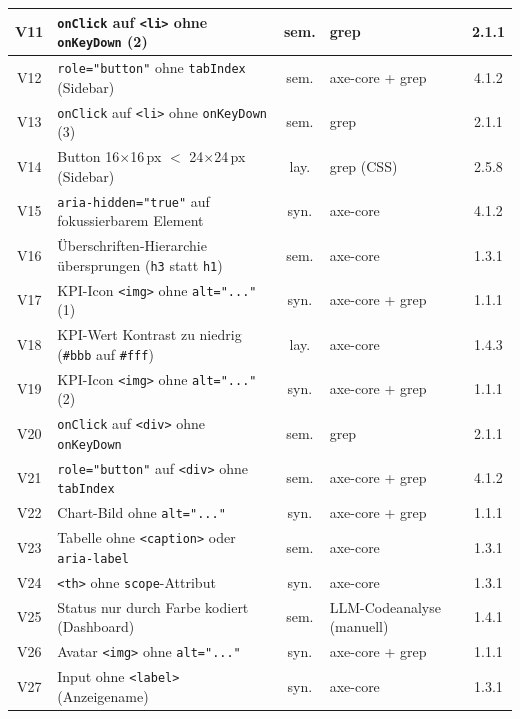 \begin{longtable}{|c|p{6.4cm}|c|p{4.0cm}|c|}
V11 & \texttt{onClick} auf \texttt{<li>} ohne \texttt{onKeyDown} (2)& sem. & grep                    & 2.1.1 \\ \hline
V12 & \texttt{role="button"} ohne \texttt{tabIndex} (Sidebar)       & sem. & axe-core + grep         & 4.1.2 \\ \hline
V13 & \texttt{onClick} auf \texttt{<li>} ohne \texttt{onKeyDown} (3)& sem. & grep                    & 2.1.1 \\ \hline
V14 & Button 16$\times$16\,px $<$ 24$\times$24\,px (Sidebar)        & lay. & grep (\ac{CSS})              & 2.5.8 \\ \hline
V15 & \texttt{aria-hidden="true"} auf fokussierbarem Element        & syn. & axe-core                & 4.1.2 \\ \hline
V16 & Überschriften-Hierarchie übersprungen (\texttt{h3} statt \texttt{h1}) & sem. & axe-core        & 1.3.1 \\ \hline
V17 & \ac{KPI}-Icon \texttt{<img>} ohne \texttt{alt="..."} (1)                 & syn. & axe-core + grep         & 1.1.1 \\ \hline
V18 & \ac{KPI}-Wert Kontrast zu niedrig (\texttt{\#bbb} auf \texttt{\#fff}) & lay. & axe-core             & 1.4.3 \\ \hline
V19 & \ac{KPI}-Icon \texttt{<img>} ohne \texttt{alt="..."} (2)                 & syn. & axe-core + grep         & 1.1.1 \\ \hline
V20 & \texttt{onClick} auf \texttt{<div>} ohne \texttt{onKeyDown}   & sem. & grep                    & 2.1.1 \\ \hline
V21 & \texttt{role="button"} auf \texttt{<div>} ohne \texttt{tabIndex} & sem. & axe-core + grep      & 4.1.2 \\ \hline
V22 & Chart-Bild ohne \texttt{alt="..."}                                  & syn. & axe-core + grep         & 1.1.1 \\ \hline
V23 & Tabelle ohne \texttt{<caption>} oder \texttt{aria-label}      & sem. & axe-core                & 1.3.1 \\ \hline
V24 & \texttt{<th>} ohne \texttt{scope}-Attribut                    & syn. & axe-core                & 1.3.1 \\ \hline
V25 & Status nur durch Farbe kodiert (Dashboard)                    & sem. & \ac{LLM}-Codeanalyse (manuell)& 1.4.1 \\ \hline
V26 & Avatar \texttt{<img>} ohne \texttt{alt="..."}                       & syn. & axe-core + grep         & 1.1.1 \\ \hline
V27 & Input ohne \texttt{<label>} (Anzeigename)                     & syn. & axe-core                & 1.3.1 \\ \hline

\end{longtable}
